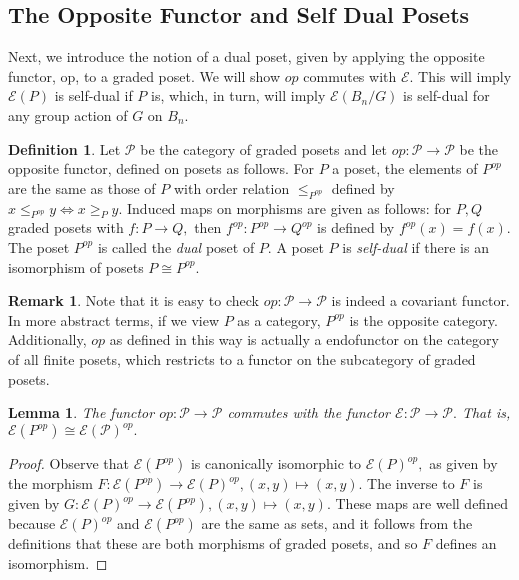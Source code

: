 \documentclass[10 pt]{amsart}
\theoremstyle{plain}
\newtheorem{lem}[thm]{Lemma}
\theoremstyle{definition}
\newtheorem{defn}[thm]{Definition}
\newtheorem{rem}[thm]{Remark}
\theoremstyle{remark}
\numberwithin{equation}{section}
\newcommand\ssec{\subsection}
\renewcommand{\iff}{\Leftrightarrow}
\begin{document}
\ssec{The Opposite Functor and Self Dual Posets}

Next, we introduce the notion of a dual poset, given by applying the opposite functor, op, to a graded poset. We will show $op$ commutes with $\mathcal E.$ This will imply $\mathcal E(P)$ is self-dual if $P$ is, which, in turn, will imply $\mathcal E(B_n/G)$ is self-dual for any group action of $G$ on $B_n$.

\begin{defn}
Let $\mathcal P$ be the category of graded posets and let $op:\mathcal P \rightarrow \mathcal P$ be the opposite functor, defined on posets as follows. For $P$ a poset, the elements of $P^{op}$ are the same as those of $P$ with order relation $\le_{P^{op}}$ defined by $x \leq_{P^{op}} y \iff x \geq_P y.$ Induced maps on morphisms are given as follows: for $P,Q$ graded posets with $f:P \rightarrow Q,$ then $f^{op}:P^{op} \rightarrow Q^{op}$ is defined by $f^{op}(x) = f(x).$ The poset $P^{op}$ is called the {\it dual} poset of $P$. A poset $P$ is {\it self-dual} if there is an isomorphism of posets $P \cong P^{op}.$
\end{defn}

\begin{rem}
Note that it is easy to check $op:\mathcal P \rightarrow \mathcal P$ is indeed a covariant functor. In more abstract terms, if we view $P$ as a category, $P^{op}$ is the opposite category. Additionally, $op$ as defined in this way is actually a endofunctor on the category of all finite posets, which restricts to a functor on the subcategory of graded posets.
\end{rem}

\begin{lem}
\label{lem:commuting_op_e}
The functor $op:\mathcal P \rightarrow \mathcal P$ commutes with the functor $\mathcal E:\mathcal P \rightarrow \mathcal P.$ That is, $\mathcal E(P^{op}) \cong \mathcal E(\mathcal P)^{op}.$
\end{lem}
\begin{proof}
Observe that $\mathcal E(P^{op})$ is canonically isomorphic to $\mathcal E(P)^{op},$ as given by the morphism $F:\mathcal E(P^{op}) \rightarrow \mathcal E(P)^{op},(x,y) \mapsto (x,y).$ The inverse to $F$ is given by $G:\mathcal E(P)^{op} \rightarrow \mathcal E(P^{op}),(x,y)\mapsto (x,y).$ These maps are well defined because $\mathcal E(P)^{op}$ and $\mathcal E(P^{op})$ are the same as sets, and it follows from the definitions that these are both morphisms of graded posets, and so $F$ defines an isomorphism.
\end{proof}
\end{document}
